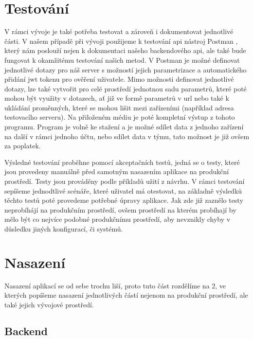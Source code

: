 \section{Testování}

V rámci vývoje je také potřeba testovat a zároveň i dokumentovat jednotlivé části. V našem případě při vývoji použijeme
k testování \gls{api} nástroj Postman \cite{postmanSW}, který nám poslouží nejen k dokumentaci našeho backendového \gls{api},
ale také bude fungovat k okamžitému testování našich metod. V Postman je možné definovat jednotlivé dotazy pro náš server s možností
jejich parametrizace a automatického přidání \gls{jwt} tokenu pro ověření uživatele. Mimo možnosti definovat jednotlivé dotazy, lze také vytvořit
pro celé prostředí jednotnou sadu parametrů, které poté mohou být využity v dotazech, ať již ve formě parametrů v \gls{url} nebo také k ukládání
proměnných, které se mohou lišit mezi zařízeními (například adresa testovacího serveru). Na přiloženém médiu je poté kompletní výstup z
tohoto programu. Program je volně ke stažení a je možné sdílet data z jednoho zařízení na další v rámci jednoho účtu, nebo sdílet data
v týmu, tato možnost je již ovšem za poplatek.

Výsledné testování proběhne pomocí akceptačních testů, jedná se o testy,
které jsou provedeny manuálně před samotným nasazením aplikace na produkční prostředí. Testy jsou prováděny podle příkladů užití z návrhu.
V rámci testování sepíšeme jednodtlivé scénáře, které uživatel má otestovat, na základně výsledků těchto testů poté provedeme potřebné
úpravy aplikace. Jak zde již zaznělo testy neprobíhájí na produkčním prostředí, ovšem prostředí na kterém probíhají by mělo být co
nejvíce podobné produkčnímu prostředí, aby nevznikly chyby v důsledku jiných konfigurací, či systémů.

\clearpage

\section{Nasazení}

Nasazení aplikací se od sebe trochu liší, proto tuto část rozdělíme na 2, ve kterých popíšeme nasazení jednotlivých částí nejenom na produkční
prostředí, ale také jejich vývojové prostředí.

\subsection{Backend}

